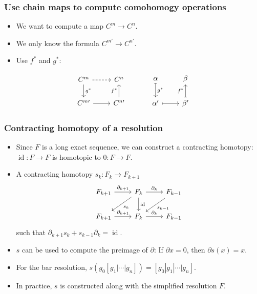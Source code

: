 \documentclass[xcolor=table, aspectratio=43,ignorenonframetext]{beamer}
\DeclareMathOperator{\id}{id}
\begin{document}
\begin{frame}[fragile]
	\frametitle{Use chain maps to compute comohomogy operations}
	\begin{itemize}
		\item We want to compute a map $C^m\rightarrow C^n$.
		\item We only know the formula $C^{m\prime}\rightarrow C^{n\prime}$.
		\item Use $f^\ast$ and $g^\ast$:
	\end{itemize}
	\[\begin{tikzcd}
		C^m\arrow[r,dashrightarrow]\arrow[d,"g^\ast"] & C^n\\
		C^{m\prime}\arrow[r] & C^{n\prime}\arrow[u,"f^\ast"]
	\end{tikzcd}\quad\quad\quad
	\begin{tikzcd}
		\alpha\arrow[d,"g^\ast",mapsto] & \beta\\
		\alpha'\arrow[r,mapsto] & \beta'\arrow[u,"f^\ast",mapsto]
	\end{tikzcd}
	\]
\end{frame}

\begin{frame}[fragile]
	\frametitle{Contracting homotopy of a resolution}
	\begin{itemize}
		\item Since $F$ is a long exact sequence, we can construct a contracting homotopy: $\id:F\rightarrow F$ is homotopic to $0:F\rightarrow F$.
		\item A contracting homotopy $s_k: F_k\rightarrow F_{k+1}$
		\[
		\begin{tikzcd}
		F_{k+1} \arrow[r,"\partial_{k+1}"]
		&F_k\arrow[r,"\partial_k"]
		\arrow[d,"\id"]
		\arrow[ld,"s_k"]&
		F_{k-1}\arrow[ld,"s_{k-1}"]\\
		F_{k+1} \arrow[r,"\partial_{k+1}"]& F_k\arrow[r,"\partial_k"]&
		F_{k-1}
		\end{tikzcd}
		\]
		such that $\partial_{k+1}s_k + s_{k-1}\partial_k = \id$.
		\item $s$ can be used to compute the preimage of $\partial$: If $\partial x=0$, then $\partial s(x) = x$.
		\item For the bar resolution, $s(g_0[g_1|\cdots|g_n])
		=[g_0|g_1|\cdots|g_n]$.
		\item In practice, $s$ is constructed along with the simplified resolution $F$.
	\end{itemize}
\end{frame}
\end{document}
